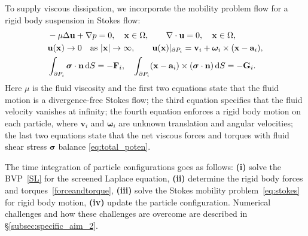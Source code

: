 To supply viscous dissipation, we incorporate the mobility problem
flow for a rigid body suspension in Stokes flow:
\begin{equation}
\label{eq:stokes}
\begin{aligned}
  &-\mu \Delta \mathbf{u} + \nabla p = 0, \quad \mathbf{x} \in \Omega, \qquad 
  \nabla \cdot \mathbf{u} = 0,  \quad \mathbf{x} \in \Omega,\\
  &{\bf u}(\mathbf{x}) \to 0 \quad \text{as}\ |\mathbf{x}|\to \infty,\qquad 
  \mathbf{u}(\mathbf{x})|_{\partial P_i} = \mathbf{v}_i +
\boldsymbol{\omega}_i\times(\mathbf{x} - \mathbf{a}_i),\\
&\int_{\partial P_i}\boldsymbol{\sigma}\cdot {\bf n} \dif S=-{\bf F}_i, \quad
\int_{\partial P_i} (\mathbf{x} - \mathbf{a}_i)\times (\boldsymbol{\sigma} \cdot \mathbf{n}) \dif S =-{\bf G}_i.
\end{aligned}
\end{equation}
Here $\mu$ is the fluid viscosity and the first two equations state that
the fluid motion is a divergence-free Stokes flow; the third equation
specifies that the fluid velocity vanishes at infinity; the fourth
equation enforces a rigid body motion on each particle, where
$\mathbf{v}_i$ and $\boldsymbol{\omega}_i$ are unknown translation and
angular velocities; the last two equations state that the net
viscous forces and torques with fluid shear stress $\boldsymbol{\sigma}$
balance \eqref{eq:total_poten}.



The time integration of
particle configurations goes as follows: \textbf{(i)} solve the
BVP~\eqref{SL} for the screened Laplace equation, \textbf{(ii)}
determine the rigid body forces and torques~\eqref{forceandtorque},
\textbf{(iii)} solve the Stokes mobility problem~\eqref{eq:stokes} for
rigid body motion, \textbf{(iv)} update the particle configuration.
Numerical challenges and how these challenges are overcome are described
in \S\ref{subsec:specific_aim_2}.


